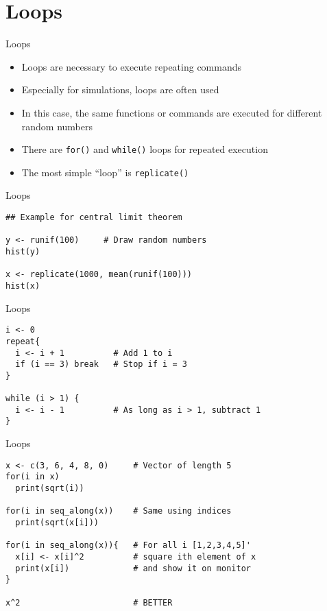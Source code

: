 \documentclass[aspectratio=169]{beamer}
\begin{document}
\section[Loops]{Loops}

\begin{frame}{Loops}
  \begin{itemize}
    \item Loops are necessary to execute repeating commands
    \item Especially for simulations, loops are often used
    \item In this case, the same functions or commands are executed for
      different random numbers
    \item There are \texttt{for()} and \texttt{while()} loops for repeated
      execution
    \item The most simple ``loop'' is \texttt{replicate()}
  \end{itemize}
\end{frame}

\begin{frame}[fragile]{Loops}
\begin{lstlisting}
## Example for central limit theorem

y <- runif(100)     # Draw random numbers
hist(y)

x <- replicate(1000, mean(runif(100)))
hist(x)
\end{lstlisting}
\end{frame}

\begin{frame}[fragile]{Loops}
\begin{lstlisting}
i <- 0
repeat{
  i <- i + 1          # Add 1 to i
  if (i == 3) break   # Stop if i = 3
}

while (i > 1) {
  i <- i - 1          # As long as i > 1, subtract 1
}
\end{lstlisting}
\end{frame}

\begin{frame}[fragile]{Loops}
\begin{lstlisting}
x <- c(3, 6, 4, 8, 0)     # Vector of length 5
for(i in x)
  print(sqrt(i))

for(i in seq_along(x))    # Same using indices
  print(sqrt(x[i]))

for(i in seq_along(x)){   # For all i [1,2,3,4,5]'
  x[i] <- x[i]^2          # square ith element of x
  print(x[i])             # and show it on monitor
}

x^2                       # BETTER
\end{lstlisting}
\end{frame}
\end{document}
